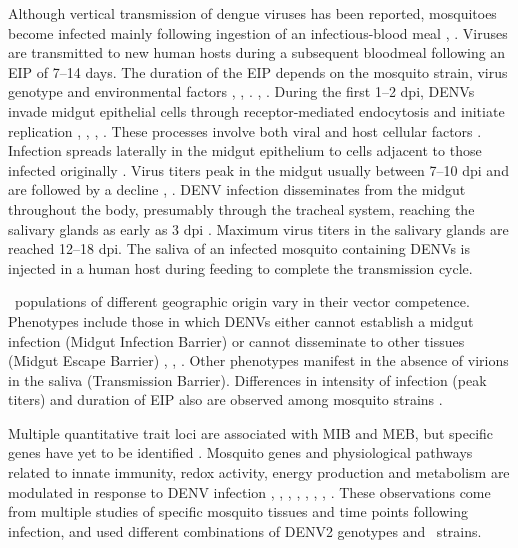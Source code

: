 Although vertical transmission of dengue viruses has been reported, mosquitoes become infected mainly following ingestion of an infectious-blood meal \cite{Gunther2007}, \cite{Angel2008}.
Viruses are transmitted to new human hosts during a subsequent bloodmeal following an \gls{EIP} of 7–14 days.
The duration of the \gls{EIP} depends on the mosquito strain, virus genotype and environmental factors \cite{Watts1987}, \cite{Black2002}, \cite{Anderson2006}. \cite{Salazar2007}, \cite{Lambrechts2011}.
During the first 1–2 \gls{dpi}, \gls{DENV}s invade midgut epithelial cells through receptor-mediated endocytosis and initiate replication \cite{Bennett2002}, \cite{Heinz2003}, \cite{Rey2003}, \cite{Mercado-Curiel2008}.
These processes involve both viral and host cellular factors \cite{Samsa2009}.
Infection spreads laterally in the midgut epithelium to cells adjacent to those infected originally \cite{Salazar2007}.
Virus titers peak in the midgut usually between 7–10 \gls{dpi} and are followed by a decline \cite{Salazar2007}, \cite{Xi2008}.
\gls{DENV} infection disseminates from the midgut throughout the body, presumably through the tracheal system, reaching the salivary glands as early as 3 \gls{dpi} \cite{Salazar2007}.
Maximum virus titers in the salivary glands are reached 12–18 \gls{dpi}.
The saliva of an infected mosquito containing \gls{DENV}s is injected in a human host during feeding to complete the transmission cycle.

\Aea\ populations of different geographic origin vary in their vector competence.
Phenotypes include those in which \gls{DENV}s either cannot establish a midgut infection (Midgut Infection Barrier) or cannot disseminate to other tissues (Midgut Escape Barrier) \cite{Black2002}, \cite{Gubler1976}, \cite{Cox2011}.
Other phenotypes manifest in the absence of virions in the saliva (Transmission Barrier).
Differences in intensity of infection (peak titers) and duration of \gls{EIP} also are observed among mosquito strains \cite{Salazar2007}.

Multiple quantitative trait loci are associated with MIB and MEB, but specific genes have yet to be identified \cite{Black2002}.
Mosquito genes and physiological pathways related to innate immunity, redox activity, energy production and metabolism are modulated in response to \gls{DENV} infection \cite{Xi2008}, \cite{Sanchez-Vargas2009}, \cite{Sim2010}, \cite{Tchankouo-Nguetcheu2010}, \cite{Luplertlop2011}, \cite{Behura2011}, \cite{Sim2012}, \cite{Colpitts2011}.
These observations come from multiple studies of specific mosquito tissues and time points following infection, and used different combinations of \gls{DENV}2 genotypes and \Aa\ strains.

